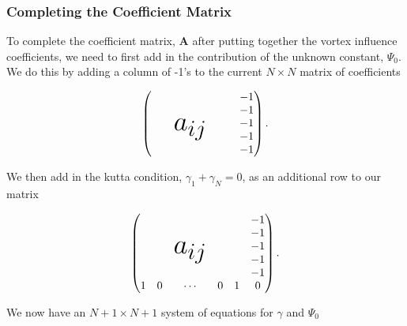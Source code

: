 \documentclass[]{article}
\begin{document}
\subsubsection{Completing the Coefficient Matrix}

To complete the coefficient matrix, \(\mathbf{A}\) after putting together the vortex influence coefficients, we need to first add in the contribution of the unknown constant, \(\Psi_0\).  We do this by adding a column of -1's to the current \(N \times N\) matrix of coefficients

\begin{equation}
\begin{pmatrix}
	& & & & & -1 \\
	& & \multirow{3}{*}{\Huge $a_{ij}$}  & & & -1 \\
	& & & & & -1 \\
	& & & & & -1 \\
	& & & & & -1
\end{pmatrix}.
\end{equation}

\noindent We then add in the kutta condition, \(\gamma_1 + \gamma_N = 0\), as an additional row to our matrix

 \begin{equation}
 	\begin{pmatrix}
 		& & & & & -1 \\
 		& & \multirow{3}{*}{\Huge $a_{ij}$}  & & & -1 \\
 		& & & & & -1 \\
 		& & & & & -1 \\
 		& & & & & -1 \\
 		1 & 0 & \cdots & 0 & 1 & 0
 	\end{pmatrix}.
 \end{equation}

We now have an \(N+1 \times N+1 \) system of equations for \(\gamma\) and \(\Psi_0\)
\end{document}
